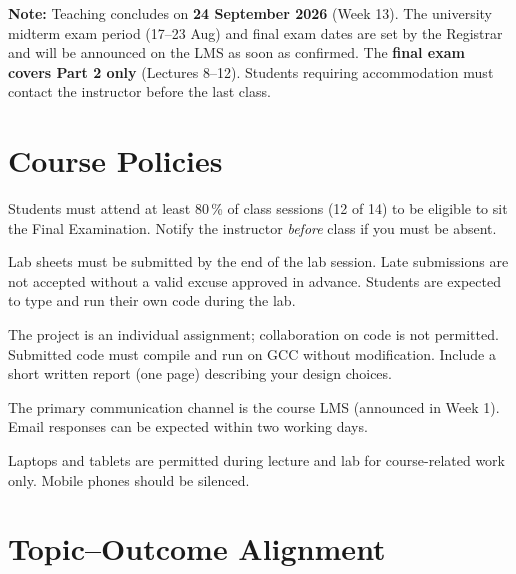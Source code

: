 \documentclass[11pt,a4paper]{article}
\begin{document}
\vspace{4pt}
{\small\color{muted}
  \textbf{Note:} Teaching concludes on \textbf{24 September 2026} (Week 13).
  The university midterm exam period (17--23 Aug) and final exam dates are set by the Registrar
  and will be announced on the LMS as soon as confirmed.
  The \textbf{final exam covers Part 2 only} (Lectures 8--12).
  Students requiring accommodation must contact the instructor before the last class.
}

\section{Course Policies}

\begin{description}[leftmargin=2em, labelwidth=1.8em, labelsep=0.2em, font=\bfseries]
  \item[Attendance]
    Students must attend at least 80\,\% of class sessions (12 of 14) to be
    eligible to sit the Final Examination.
    Notify the instructor \emph{before} class if you must be absent.

  \item[Lab Work]
    Lab sheets must be submitted by the end of the lab session.
    Late submissions are not accepted without a valid excuse approved in advance.
    Students are expected to type and run their own code during the lab.

  \item[Project]
    The project is an individual assignment; collaboration on code is not permitted.
    Submitted code must compile and run on GCC without modification.
    Include a short written report (one page) describing your design choices.

  \item[Communication]
    The primary communication channel is the course LMS (announced in Week 1).
    Email responses can be expected within two working days.

  \item[Devices]
    Laptops and tablets are permitted during lecture and lab for course-related work only.
    Mobile phones should be silenced.
\end{description}

\section{Topic--Outcome Alignment}
\end{document}
